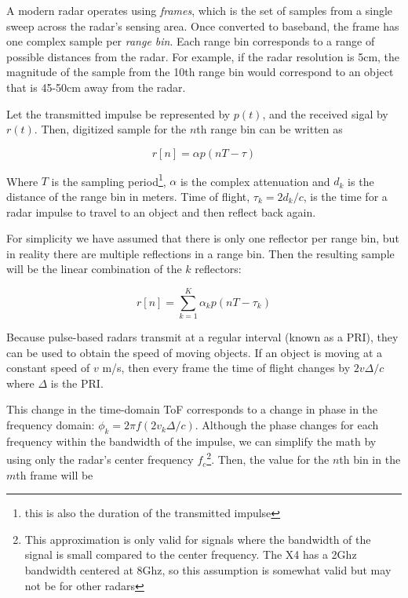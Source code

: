\documentclass[12pt]{article}
\begin{document}

A modern radar operates using \emph{frames}, which is the set of
samples from a single sweep across the radar's sensing area. Once
converted to baseband, the frame has one complex sample per
\emph{range bin}. Each range bin corresponds to a range of possible
distances from the radar. For example, if the radar resolution is 5cm,
the magnitude of the sample from the 10th range bin would correspond
to an object that is 45-50cm away from the radar.

Let the transmitted impulse be represented by $p(t)$, and the received
sigal by $r(t)$. Then, digitized sample for the $n$th range bin can be
written as

\begin{equation}
r[n] = \alpha p(nT - \tau)  
\end{equation}

Where $T$ is the sampling period\footnote{this is also the duration of
  the transmitted impulse}, $\alpha$ is the complex attenuation and
$d_k$ is the distance of the range bin in meters. Time of flight,
$\tau_k = 2d_k/c$, is the time for a radar impulse to travel to an object and
then reflect back again. 

For simplicity we have assumed that there is only one reflector per
range bin, but in reality there are multiple reflections in a range
bin. Then the resulting sample will be the linear combination of the
$k$ reflectors:

\begin{equation}
r[n] = \sum\limits_{k=1}^K \alpha_k p(nT - \tau_k)  
\end{equation}

Because pulse-based radars transmit at a regular interval (known as a
PRI), they can be used to obtain the speed of moving objects. If an
object is moving at a constant speed of $v$ m/s, then every frame the
time of flight changes by $2v\Delta/c$ where $\Delta$ is the PRI.

This change in the time-domain ToF corresponds to a change in phase in
the frequency domain: $\phi_k = 2\pi f (2v_k\Delta/c)$. Although the phase
changes for each frequency within the bandwidth of the impulse, we can
simplify the math by using only the radar's center frequency
$f_c$\footnote{This approximation is only valid for signals where the
  bandwidth of the signal is small compared to the center
  frequency. The X4 has a 2Ghz bandwidth centered at 8Ghz, so this
  assumption is somewhat valid but may not be for other radars}. Then,
the value for the $n$th bin in the $m$th frame will be
\end{document}
